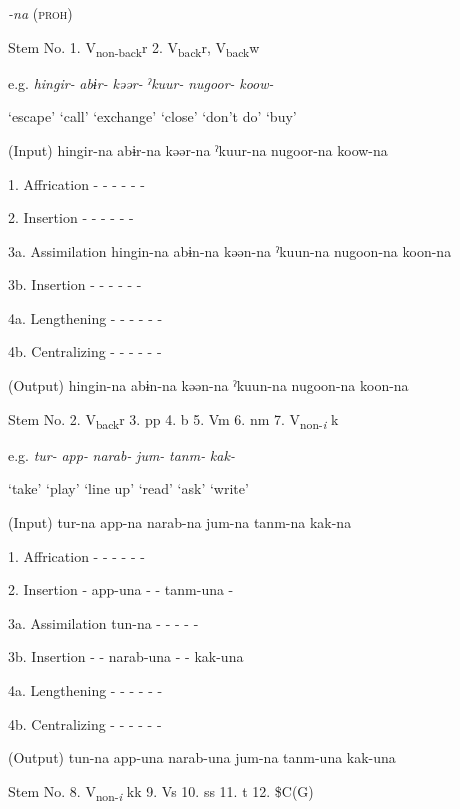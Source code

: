 \begin{table}
\caption{\label{tab:key:64}. Verbal stems +} \textmd{\textit{{}-na}}\textmd{ (\textsc{proh})}

Stem No.  1. V\textsubscript{non-back}r  2. V\textsubscript{back}r, V\textsubscript{back}w

  e.g.  \textit{hingir-}  \textit{abɨr-}  \textit{kəər-}  \textit{ˀkuur-}  \textit{nugoor-}  \textit{koow-}

    ‘escape’  ‘call’  ‘exchange’  ‘close’  ‘don’t do’  ‘buy’

  (Input)  hingir-na  abɨr-na  kəər-na  ˀkuur-na  nugoor-na  koow-na

1.  Affrication  {}-  {}-  {}-  {}-  {}-  {}-

2.  Insertion  {}-  {}-  {}-  {}-  {}-  {}-

3a.  Assimilation  hingin-na  abɨn-na  kəən-na  ˀkuun-na  nugoon-na  koon-na

3b.  Insertion  {}-  {}-  {}-  {}-  {}-  {}-

4a.  Lengthening  {}-  {}-  {}-  {}-  {}-  {}-

4b.  Centralizing  {}-  {}-  {}-  {}-  {}-  {}-

  (Output)  hingin-na  abɨn-na  kəən-na  ˀkuun-na  nugoon-na  koon-na

Stem No.  2. V\textsubscript{back}r  3. pp  4. b  5. Vm  6. nm  7. V\textsubscript{non-}\textit{\textsubscript{i} }k

  e.g.  \textit{tur-}  \textit{app-}  \textit{narab-}  \textit{jum-}  \textit{tanm-}  \textit{kak-}

    ‘take’  ‘play’  ‘line up’  ‘read’  ‘ask’  ‘write’

  (Input)  tur-na  app-na  narab-na  jum-na  tanm-na  kak-na

1.  Affrication  {}-  {}-  {}-  {}-  {}-  {}-

2.  Insertion  {}-  app-una  {}-  {}-  tanm-una  {}-

3a.  Assimilation  tun-na  {}-  {}-  {}-  {}-  {}-

3b.  Insertion  {}-  {}-  narab-una  {}-  {}-  kak-una

4a.  Lengthening  {}-  {}-  {}-  {}-  {}-  {}-

4b.  Centralizing  {}-  {}-  {}-  {}-  {}-  {}-

  (Output)  tun-na  app-una  narab-una  jum-na  tanm-una  kak-una

  Stem No.  8. V\textsubscript{non-}\textit{\textsubscript{i} }kk  9. Vs  10. ss  11. t  12. \$C(G)


\end{table}
